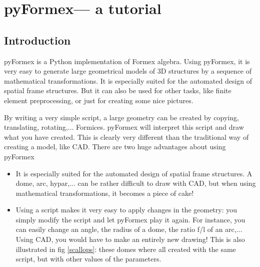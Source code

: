 \documentclass[a4paper]{manual}
\newcommand{\pyformex}{pyFormex\xspace}
\begin{document}
\chapter{\pyformex --- a tutorial}
{\label{cha:tutorial}


\section{Introduction}
\label{sec:intro-tut}
\pyformex is a Python implementation of Formex algebra. Using \pyformex, it is very easy to  generate large geometrical models of 3D structures by a sequence of mathematical transformations. It is especially suited for the automated design of spatial frame structures. But it can also be used for other tasks, like finite element preprocessing, or just for creating some nice pictures.

By writing a very simple script, a large geometry can be created by copying, translating, rotating,... Formices. \pyformex will interpret this script and draw what you have created. This is clearly very different than the traditional way of creating a model, like CAD. There are two huge advantages about using \pyformex

\begin{itemize}
\item It is especially suited for the automated design of spatial frame structures. A dome, arc, hypar,... can be rather difficult to draw with CAD, but when using mathematical transformations, it becomes a piece of cake!
\item Using a script makes it very easy to apply changes in the geometry: you simply modify the script and let \pyformex play it again. For instance, you can easily change an angle, the radius of a dome, the ratio f/l of an arc,... Using CAD, you would have to make an entirely new drawing! This is also illustrated in fig \ref{scallops}: these domes where all created with the same script, but with other values of the parameters.
\end{itemize}

}
\end{document}
